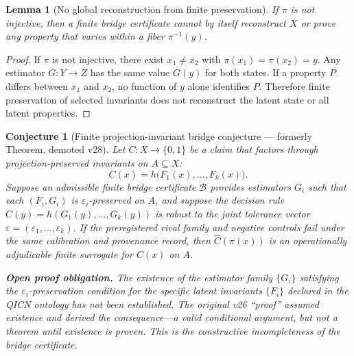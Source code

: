 \documentclass[11pt]{article}
\newtheorem{lemma}{Lemma}
\newtheorem{conjecture}{Conjecture}
\begin{document}
\begin{lemma}[No global reconstruction from finite preservation]
If $\pi$ is not injective, then a finite bridge certificate cannot by itself reconstruct $X$ or prove any property that varies within a fiber $\pi^{-1}(y)$.
\end{lemma}
\begin{proof}
If $\pi$ is not injective, there exist $x_1\neq x_2$ with $\pi(x_1)=\pi(x_2)=y$. Any estimator $G:Y\to Z$ has the same value $G(y)$ for both states. If a property $P$ differs between $x_1$ and $x_2$, no function of $y$ alone identifies $P$. Therefore finite preservation of selected invariants does not reconstruct the latent state or all latent properties.
\end{proof}

\begin{conjecture}[Finite projection-invariant bridge conjecture --- formerly Theorem, demoted v28]
Let $C:X\to\{0,1\}$ be a claim that factors through projection-preserved invariants on $A\subseteq X$:
\[
C(x)=h\bigl(F_1(x),\ldots,F_k(x)\bigr).
\]
Suppose an admissible finite bridge certificate $\mathcal{B}$ provides estimators $G_i$ such that each $(F_i,G_i)$ is $\varepsilon_i$-preserved on $A$, and suppose the decision rule $\widehat C(y)=h(G_1(y),\ldots,G_k(y))$ is robust to the joint tolerance vector $\varepsilon=(\varepsilon_1,\ldots,\varepsilon_k)$. If the preregistered rival family and negative controls fail under the same calibration and provenance record, then $\widehat C(\pi(x))$ is an operationally adjudicable finite surrogate for $C(x)$ on $A$.

\medskip\noindent\textbf{Open proof obligation.} The existence of the estimator family $\{G_i\}$ satisfying the $\varepsilon_i$-preservation condition for the specific latent invariants $\{F_i\}$ declared in the QICN ontology has not been established. The original v26 ``proof'' assumed existence and derived the consequence---a valid conditional argument, but not a theorem until existence is proven. This is the constructive incompleteness of the bridge certificate.
\end{conjecture}
\end{document}
